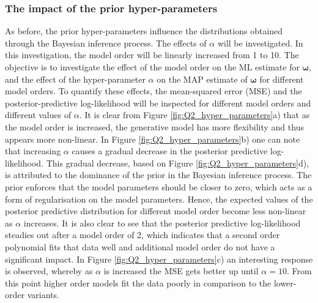 \documentclass{article}
\begin{document}
\subsubsection{The impact of the prior hyper-parameters}
As before, the prior hyper-parameters influence the distributions obtained through the Bayesian inference process. The effects of $\alpha$ will be investigated. In this investigation, the model order will be linearly increased from 1 to 10. The objective is to investigate the effect of the model order on the ML estimate for $\boldsymbol\omega$, and the effect of the hyper-parameter $\alpha$ on the MAP estimate of $\boldsymbol\omega$ for different model orders. To quantify these effects, the mean-squared error (MSE) and the posterior-predictive log-likelihood will be inspected for different model orders and different values of $\alpha$. It is clear from Figure \ref{fig:Q2_hyper_parameters}a) that as the model order is increased, the generative model has more flexibility and thus appears more non-linear. In Figure \ref{fig:Q2_hyper_parameters}b) one can note that increasing $\alpha$ causes a gradual decrease in the posterior predictive log-likelihood. This gradual decrease, based on Figure \ref{fig:Q2_hyper_parameters}d), is attributed to the dominance of the prior in the Bayesian inference process. The prior enforces that the model parameters should be closer to zero, which acts as a form of regularisation on the model parameters. Hence, the expected values of the posterior predictive distribution for different model order become less non-linear as $\alpha$ increases. It is also clear to see that the posterior predictive log-likelihood steadies out after a model order of 2, which indicates that a second order polynomial fits that data well and additional model order do not have a significant impact. In Figure \ref{fig:Q2_hyper_parameters}c) an interesting response is observed, whereby as $\alpha$ is increased the MSE gets better up until $\alpha = 10$. From this point higher order models fit the data poorly in comparison to the lower-order variants.
\end{document}

